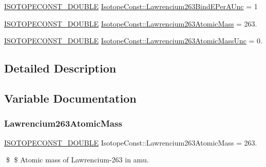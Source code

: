 \begin{DoxyCompactItemize}
\mbox{\hyperlink{group___isotope_const-_macros_ga8f45a7272ce02c0b4c65c44636ed719a}{I\+S\+O\+T\+O\+P\+E\+C\+O\+N\+S\+T\+\_\+\+D\+O\+U\+B\+LE}} \mbox{\hyperlink{group___isotope_const-_lawrencium-_lr263_ga538e67ee1b2c05473a9e1817905505d8}{Isotope\+Const\+::\+Lawrencium263\+Bind\+E\+Per\+A\+Unc}} = 1
\item 
\mbox{\hyperlink{group___isotope_const-_macros_ga8f45a7272ce02c0b4c65c44636ed719a}{I\+S\+O\+T\+O\+P\+E\+C\+O\+N\+S\+T\+\_\+\+D\+O\+U\+B\+LE}} \mbox{\hyperlink{group___isotope_const-_lawrencium-_lr263_ga264ac6c30e625d4ea17d2ad5cbf9e723}{Isotope\+Const\+::\+Lawrencium263\+Atomic\+Mass}} = 263.
\item 
\mbox{\hyperlink{group___isotope_const-_macros_ga8f45a7272ce02c0b4c65c44636ed719a}{I\+S\+O\+T\+O\+P\+E\+C\+O\+N\+S\+T\+\_\+\+D\+O\+U\+B\+LE}} \mbox{\hyperlink{group___isotope_const-_lawrencium-_lr263_ga7ad98f8198e6354d8ab19b71e5abc582}{Isotope\+Const\+::\+Lawrencium263\+Atomic\+Mass\+Unc}} = 0.
\end{DoxyCompactItemize}


\subsection{Detailed Description}


\subsection{Variable Documentation}
\mbox{\label{group___isotope_const-_lawrencium-_lr263_ga264ac6c30e625d4ea17d2ad5cbf9e723}} 
\subsubsection{\texorpdfstring{Lawrencium263\+Atomic\+Mass}{Lawrencium263AtomicMass}}
{\footnotesize\ttfamily \mbox{\hyperlink{group___isotope_const-_macros_ga8f45a7272ce02c0b4c65c44636ed719a}{I\+S\+O\+T\+O\+P\+E\+C\+O\+N\+S\+T\+\_\+\+D\+O\+U\+B\+LE}} Isotope\+Const\+::\+Lawrencium263\+Atomic\+Mass = 263.}

\$ \$ Atomic mass of Lawrencium-\/263 in amu. \mbox{\label{group___isotope_const-_lawrencium-_lr263_ga7ad98f8198e6354d8ab19b71e5abc582}} 
